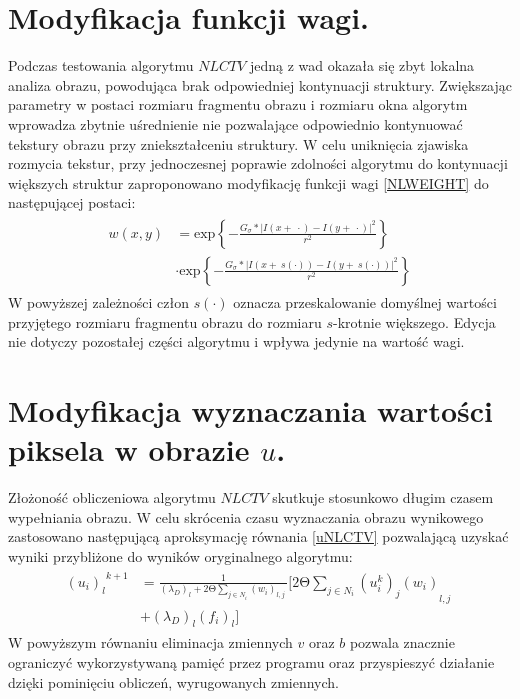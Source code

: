 \documentclass[12pt, twoside, openany]{report}
\theoremstyle{definition}
\begin{document}
\section{Modyfikacja funkcji wagi.}
Podczas testowania algorytmu $NLCTV$ jedną z wad okazała się zbyt lokalna analiza obrazu, powodująca brak odpowiedniej kontynuacji struktury. Zwiększając parametry w postaci rozmiaru fragmentu obrazu i rozmiaru okna algorytm wprowadza zbytnie uśrednienie nie pozwalające odpowiednio kontynuować tekstury obrazu przy zniekształceniu struktury. W celu uniknięcia zjawiska rozmycia tekstur, przy jednoczesnej poprawie zdolności algorytmu do kontynuacji większych struktur zaproponowano modyfikację funkcji wagi \eqref{NLWEIGHT} do następującej postaci:
\begin{align}
\begin{aligned}
w\left(x,y\right) &= {\mathrm{exp} \left\{-\frac{G_{\sigma }*{\left|I\left(x+\ \cdot \right)-I\left(y+\ \cdot \right)\right|}^2}{r^2}\right\} }\\
&\cdot {\mathrm{exp} \left\{-\frac{G_{\sigma }*{\left|I\left(x+\ s(\cdot) \right)-I\left(y+\ s(\cdot) \right)\right|}^2}{r^2}\right\} }
\label{NLWEIGHTMODIFIED}
\end{aligned}
\end{align}
W powyższej zależności człon $s(\cdot)$ oznacza przeskalowanie  domyślnej wartości przyjętego rozmiaru fragmentu obrazu do rozmiaru $s$-krotnie większego. Edycja nie dotyczy pozostałej części  algorytmu i wpływa jedynie na wartość wagi.
\section{Modyfikacja wyznaczania wartości piksela w obrazie $u$.}
Złożoność obliczeniowa algorytmu $NLCTV$ skutkuje stosunkowo długim czasem wypełniania obrazu. W celu skrócenia czasu wyznaczania obrazu wynikowego zastosowano następującą aproksymację równania  \eqref{uNLCTV} pozwalającą uzyskać wyniki przybliżone do wyników oryginalnego algorytmu:
\begin{align}
\begin{aligned}
{{\left(u_i\right)}_l}^{k+1} &= \frac{1}{{\left({\lambda }_D\right)}_l+2\mathrm{\Theta} \sum\limits_{j\in N_i} {\left(w_i\right)}_{l,j}\ } \Biggl[2\mathrm{\Theta }\sum_{j\in N_i} {{{\left(u^k_i\right)}_j\left(w_i\right)}_{l,j}\ }\\
&+ {\left({\lambda }_D\right)}_l{\left(f_i\right)}_l\Biggr]
\end{aligned}
\label{NLH1}
\end{align}
W powyższym równaniu eliminacja zmiennych $v$ oraz $b$ pozwala znacznie ograniczyć wykorzystywaną pamięć przez programu oraz przyspieszyć działanie dzięki pominięciu obliczeń, wyrugowanych zmiennych.
\end{document}
